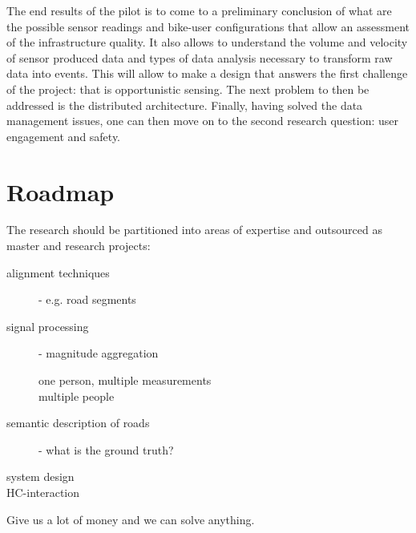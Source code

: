 \documentclass[preprint,12pt]{elsarticle}
\theoremstyle{definition}
\begin{document}
The end results of the pilot is to come to a preliminary conclusion of
what are the possible sensor readings and bike-user configurations
that allow an assessment of the infrastructure quality. It also allows
to understand the volume and velocity of sensor produced data and
types of data analysis necessary to transform raw data into
events. This will allow to make a design that answers the first
challenge of the project: that is opportunistic sensing. The next
problem to then be addressed is the distributed architecture. Finally,
having solved the data management issues, one can then move on to the
second research question: user engagement and safety.


\section{Roadmap}

The research should be partitioned into areas of expertise and
outsourced as master and research projects:
\begin{description}
\item[alignment techniques] - e.g. road segments
\item[signal processing] - magnitude aggregation 
\begin{description}
	\item[one person, multiple measurements]
	\item[multiple people]
\end{description}
\item[semantic description of roads] - what is the ground truth?
\item[system design]
\item[HC-interaction]
\end{description}


Give us a lot of money and we can solve anything.





\end{document}
